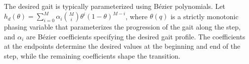 \documentclass[letterpaper, 10 pt, conference]{ieeeconf}
\newcommand{\ara}[1]{\textcolor{purple}{(ARA: #1)}}
\begin{document}





The desired gait is typically parameterized using Bézier polynomials. Let $\displaystyle{h_d(\theta) =
\sum_{i=0}^{M} \alpha_i
\binom{M}{i}
\theta^i (1-\theta)^{M-i}}$, where $\theta(q)$ is a strictly monotonic phasing variable that
parameterizes the progression of the gait along the step, and
$\alpha_i$ are Bézier coefficients specifying the desired gait profile.
The coefficients at the endpoints determine the desired values at the beginning and end of the step, while the remaining coefficients shape the transition. 

\end{document}
